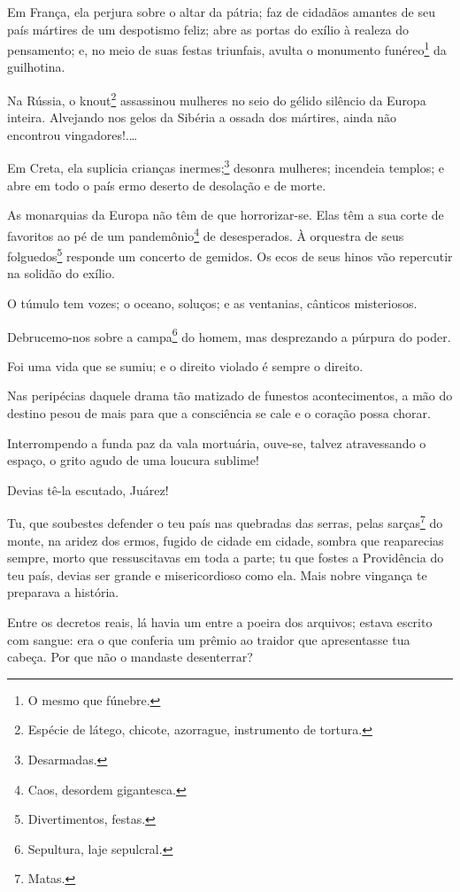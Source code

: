 Em França, ela perjura sobre o altar da pátria; faz de cidadãos amantes
de seu país mártires de um despotismo feliz; abre as portas do exílio à
realeza do pensamento; e, no meio de suas festas triunfais, avulta o
monumento funéreo\footnote{O mesmo que fúnebre.} da guilhotina.

Na Rússia, o knout\footnote{Espécie de látego, chicote, azorrague,
  instrumento de tortura.} assassinou mulheres no seio do gélido
silêncio da Europa inteira. Alvejando nos gelos da Sibéria a ossada dos
mártires, ainda não encontrou vingadores!.\ldots{}

Em Creta, ela suplicia crianças inermes;\footnote{Desarmadas.} desonra
mulheres; incendeia templos; e abre em todo o país ermo deserto de
desolação e de morte.

As monarquias da Europa não têm de que horrorizar-se. Elas têm a sua
corte de favoritos ao pé de um pandemônio\footnote{Caos, desordem
  gigantesca.} de desesperados. À orquestra de seus folguedos\footnote{
  Divertimentos, festas.} responde um concerto de gemidos. Os ecos de
seus hinos vão repercutir na solidão do exílio.

O túmulo tem vozes; o oceano, soluços; e as ventanias, cânticos
misteriosos.

Debrucemo-nos sobre a campa\footnote{Sepultura, laje sepulcral.} do
homem, mas desprezando a púrpura do poder.

Foi uma vida que se sumiu; e o direito violado é sempre o direito.

Nas peripécias daquele drama tão matizado de funestos acontecimentos, a
mão do destino pesou de mais para que a consciência se cale e o coração
possa chorar.

Interrompendo a funda paz da vala mortuária, ouve-se, talvez
atravessando o espaço, o grito agudo de uma loucura sublime!

Devias tê-la escutado, Juárez!

Tu, que soubestes defender o teu país nas quebradas das serras, pelas
sarças\footnote{Matas.} do monte, na aridez dos ermos, fugido de
cidade em cidade, sombra que reaparecias sempre, morto que ressuscitavas
em toda a parte; tu que fostes a Providência do teu país, devias ser
grande e misericordioso como ela. Mais nobre vingança te preparava a
história.

Entre os decretos reais, lá havia um entre a poeira dos arquivos; estava
escrito com sangue: era o que conferia um prêmio ao traidor que
apresentasse tua cabeça. Por que não o mandaste desenterrar?

